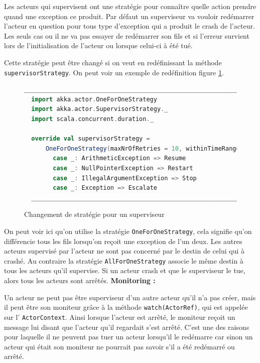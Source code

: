 \documentclass[12pt, a4paper]{article}
\begin{document}
\par Les acteurs qui supervisent ont une stratégie pour connaître  quelle action prendre quand une exception ce produit. Par défaut un superviseur va vouloir redémarrer l'acteur en question pour tous type d'exception qui a produit le crash de l'acteur. Les seuls cas ou il ne va pas essayer de redémarrer son fils et si l'erreur survient lors de l'initialisation de l'acteur ou lorsque celui-ci à été tué.
\par Cette stratégie peut être changé si on veut en redéfinissant la méthode \texttt{supervisorStrategy}. On peut voir un exemple de redéfinition figure \ref{fig3}.

\begin{figure}[h!]
  \begin{lstlisting}[language=scala]
  __________________________________________________________________________
  import akka.actor.OneForOneStrategy
  import akka.actor.SupervisorStrategy._
  import scala.concurrent.duration._

  override val supervisorStrategy =
      OneForOneStrategy(maxNrOfRetries = 10, withinTimeRange = 1 minute) {
        case _: ArithmeticException => Resume
        case _: NullPointerException => Restart
        case _: IllegalArgumentException => Stop
        case _: Exception => Escalate
  __________________________________________________________________________
  \end{lstlisting}
  \caption{Changement de stratégie pour un superviseur \cite{akka}}
  \label{fig3}
\end{figure}
\par On peut voir ici qu'on utilise la stratégie \texttt{OneForOneStrategy}, cela signifie qu'on différencie tous les fils lorsqu'on reçoit une exception de l'un deux. Les autres acteurs supervisé par l'acteur ne sont pas concerné par le destin de celui qui à crashé. Au contraire la stratégie \texttt{AllForOneStrategy} associe le même destin à tous les acteurs qu'il supervise. Si un acteur crash et que le superviseur le tue, alors tous les acteurs sont arrêtés.
\newline
\newline
\textbf{Monitoring :}
\par Un acteur ne peut pas être superviseur d'un autre acteur qu'il n'a pas créer, mais il peut être son moniteur grâce à la méthode \texttt{watch(ActorRef)}, qui est appelée sur l' \texttt{ActorContext}. Ainsi lorsque l'acteur est arrêté, le moniteur reçoit un message lui disant que l'acteur qu'il regardait s'est arrêté. C'est une des raisons pour laquelle il ne peuvent pas tuer un acteur lorsqu'il le redémarre car sinon un acteur qui était son moniteur ne pourrait pas savoir s'il a été redémarré ou arrêté.
\end{document}
